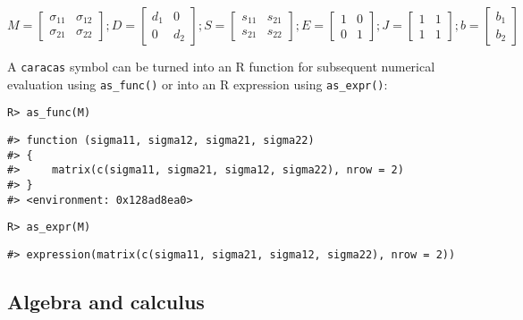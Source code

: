 \begin{equation}
M = \left[\begin{matrix}\sigma_{11} & \sigma_{12}\\\sigma_{21} & \sigma_{22}\end{matrix}\right];
D = \left[\begin{matrix}d_{1} & 0\\0 & d_{2}\end{matrix}\right];
S = \left[\begin{matrix}s_{11} & s_{21}\\s_{21} & s_{22}\end{matrix}\right];
E = \left[\begin{matrix}1 & 0\\0 & 1\end{matrix}\right];
J = \left[\begin{matrix}1 & 1\\1 & 1\end{matrix}\right];
b = \left[\begin{matrix}b_{1}\\b_{2}\end{matrix}\right]
\end{equation}

A \texttt{caracas} symbol can be turned into an R function for subsequent
numerical evaluation using \texttt{as\_func()} or into an R expression using \texttt{as\_expr()}:

\begin{verbatim}
R> as_func(M)
\end{verbatim}

\begin{verbatim}
#> function (sigma11, sigma12, sigma21, sigma22) 
#> {
#>     matrix(c(sigma11, sigma21, sigma12, sigma22), nrow = 2)
#> }
#> <environment: 0x128ad8ea0>
\end{verbatim}

\begin{verbatim}
R> as_expr(M)
\end{verbatim}

\begin{verbatim}
#> expression(matrix(c(sigma11, sigma21, sigma12, sigma22), nrow = 2))
\end{verbatim}

\hypertarget{algebra-and-calculus}{%
\subsection{Algebra and calculus}\label{algebra-and-calculus}}

